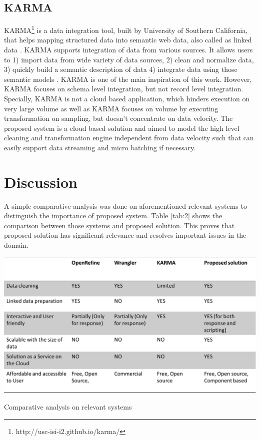 \subsection{KARMA}
KARMA\footnote{http://usc-isi-i2.github.io/karma/} is a data integration tool, built by University of Southern California, that helps mapping structured data into semantic web data, also called as linked data \cite{karma}. KARMA supports integration of data from various sources. It allows users to 1) import data from wide variety of data sources, 2) clean and normalize data, 3) quickly build a semantic description of data  4) integrate data using those semantic models \cite{knoblock15:aimag}. KARMA is one of the main inspiration of this work. However, KARMA focuses on schema level integration, but not record level integration. Specially, KARMA is not a cloud based application, which hinders execution on very large volume \cite{knoblock15:aimag} as well as KARMA focuses on volume by executing transformation on sampling, but doesn't concentrate on data velocity. The proposed system is a cloud based solution and aimed to model the high level cleaning and transformation engine independent from data velocity such that can easily support data streaming and micro batching if necessary. 
\section{Discussion}
A simple comparative analysis was done on aforementioned relevant systems to distinguish the importance of proposed system. Table \ref{tab:2} shows the comparison between those systems and proposed solution. This proves that proposed solution has significant relevance and resolves important issues in the domain. 
\begin{center}
	\includegraphics[width=38em]{./Figures/comparative_analysis}
	\begin{table}[htbp]
    \caption{Comparative analysis on relevant systems}
    \label{tab:2}
	\end{table}
\end{center}
